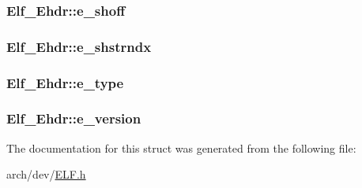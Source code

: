 \hypertarget{struct_elf___ehdr_a70667851b5ea9da70a987c770b0fa509}{
\subsubsection[{e\+\_\+shoff}]{ Elf\+\_\+\+Ehdr\+::e\+\_\+shoff}}\label{struct_elf___ehdr_a70667851b5ea9da70a987c770b0fa509}
\hypertarget{struct_elf___ehdr_a1e40358ee7d4b292cb10cfc751089da9}{
\subsubsection[{e\+\_\+shstrndx}]{ Elf\+\_\+\+Ehdr\+::e\+\_\+shstrndx}}\label{struct_elf___ehdr_a1e40358ee7d4b292cb10cfc751089da9}
\hypertarget{struct_elf___ehdr_afee2ba36e8002b99ab3ae04e9e46c682}{
\subsubsection[{e\+\_\+type}]{ Elf\+\_\+\+Ehdr\+::e\+\_\+type}}\label{struct_elf___ehdr_afee2ba36e8002b99ab3ae04e9e46c682}
\hypertarget{struct_elf___ehdr_ad28de2914498d3177a86b04fc0ff59a2}{
\subsubsection[{e\+\_\+version}]{ Elf\+\_\+\+Ehdr\+::e\+\_\+version}}\label{struct_elf___ehdr_ad28de2914498d3177a86b04fc0ff59a2}


The documentation for this struct was generated from the following file\+:\begin{DoxyCompactItemize}
\item 
arch/dev/\hyperlink{_e_l_f_8h}{E\+L\+F.\+h}\end{DoxyCompactItemize}
